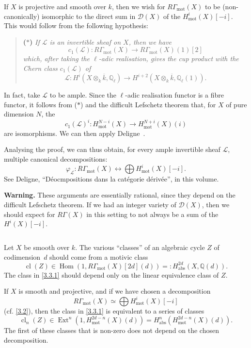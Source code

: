\documentclass{article}
\theoremstyle{plain}
\theoremstyle{definition}
\newcommand{\sh}[1]{{\mathscr{#1}}}
\newcommand{\QQ}{\mathbb{Q}}
\newcommand{\mot}{\mathrm{mot}}
\newcommand{\abs}{\mathrm{abs}}
\DeclareMathOperator{\Hom}{Hom}
\DeclareMathOperator{\Ext}{Ext}
\DeclareMathOperator{\cl}{cl}
\newcommand{\oldpage}[1]{\marginpar{\footnotesize$\Big\vert$ \textit{p.~#1}}}
\begin{document}
If $X$ is projective and smooth over $k$, then we wish for $R\Gamma_\mot(X)$ to be (non-canonically) isomorphic to the direct sum in $\sh{D}(X)$ of the $H_\mot^i(X)[-i]$.
This would follow from the following hypothesis:
\begin{quote}
  \textbf{($*$)}
\itshape
  If $\sh{L}$ is an invertible sheaf on $X$, then we have
  \[c_1(\sh{L})\colon R\Gamma_\mot(X)\to R\Gamma_\mot(X)(1)[2]\]
  which, after taking the $\ell$-adic realisation, gives the cup product with the Chern class $c_1(\sh{L})$ of
  \[\sh{L}\colon H^i(X\otimes_k\overline{k},\QQ_\ell) \to H^{i+2}(X\otimes_k\overline{k},\QQ_\ell(1)).\]
\end{quote}

In fact, take $\sh{L}$ to be ample.
Since the $\ell$-adic realisation functor is a fibre functor, it follows from ($*$) and the difficult Lefschetz theorem that, for $X$ of pure dimension $N$, the
\[
  c_1(\sh{L})^i\colon H_\mot^{N-i}(X) \to H_\mot^{N+i}(X)(i)
\]
are isomorphisms.
We can then apply Deligne~\cite{8}.

\oldpage{156}
Analysing the proof, we can thus obtain, for every ample invertible sheaf $\sh{L}$, multiple canonical decompositions:
\[
  \varphi_\sh{L}\colon R\Gamma_\mot(X) \leftrightarrow \bigoplus H_\mot^i(X)[-i].
\]
See Deligne, ``D\'{e}ocmpositions dans la cat\'{e}gorie d\'{e}riv\'{e}e'', in this volume.

\bigskip

\textbf{Warning.}
These arguments are essentially rational, since they depend on the difficult Lefschetz theorem.
If we had an integer variety of $\sh{D}(X)$, then we should expect for $R\Gamma(X)$ in this setting to not always be a sum of the $H^i(X)[-i]$.


\subsection{}
\label{3.3}

Let $X$ be smooth over $k$.
The various ``classes'' of an algebraic cycle $Z$ of codimension~$d$ should come from a motivic class
\[
\label{3.3.1}
  \cl(Z) \in \Hom(1,R\Gamma_\mot(X)[2d](d)) =: H_\abs^{2d}(X,\QQ(d)).
\tag{3.3.1}
\]
The class in \cref{3.3.1} should depend only on the linear equivalence class of $Z$.

If $X$ is smooth and projective, and if we have chosen a decomposition
\[
  R\Gamma_\mot(X) \simeq \bigoplus H_\mot^i(X)[-i]
\]
(cf. \cref{3.2}), then the class in \cref{3.3.1} is equivalent to a series of classes
\[
\label{3.3.2}
  \cl_n(Z) \in \Ext^n(1,H_\mot^{2d-n}(X)(d)) = H_\abs^n(H_\mot^{2d-n}(X)(d)).
\tag{3.3.2}
\]
The first of these classes that is non-zero does not depend on the chosen decomposition.
\end{document}
